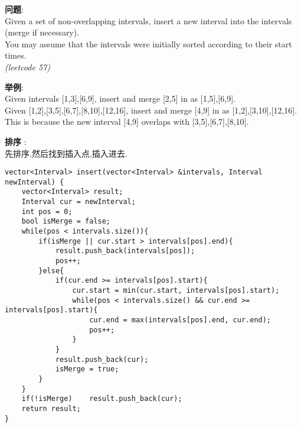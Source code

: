     
\begin{description}
    \item{\textbf{问题}}:\\
Given a set of non-overlapping intervals, insert a new interval into the intervals (merge if necessary).\\
You may assume that the intervals were initially sorted according to their start times.\\
 \textit{(leetcode 57)}
	\item{\textbf{举例}}:\\
Given intervals [1,3],[6,9], insert and merge [2,5] in as [1,5],[6,9].\\
Given [1,2],[3,5],[6,7],[8,10],[12,16], insert and merge [4,9] in as [1,2],[3,10],[12,16].\\
This is because the new interval [4,9] overlaps with [3,5],[6,7],[8,10].\\
    \item{\textbf{排序}} : 
    \\先排序,然后找到插入点,插入进去.
    \begin{lstlisting}
vector<Interval> insert(vector<Interval> &intervals, Interval newInterval) {
	vector<Interval> result;
	Interval cur = newInterval;
	int pos = 0;
	bool isMerge = false;
	while(pos < intervals.size()){
		if(isMerge || cur.start > intervals[pos].end){
			result.push_back(intervals[pos]);
			pos++;
		}else{
			if(cur.end >= intervals[pos].start){
				cur.start = min(cur.start, intervals[pos].start);
				while(pos < intervals.size() && cur.end >= intervals[pos].start){
					cur.end = max(intervals[pos].end, cur.end);
					pos++;
				}
			}
			result.push_back(cur);
			isMerge = true;
		}
	}
	if(!isMerge)	result.push_back(cur);
	return result;
}
    \end{lstlisting}
\end{description}
